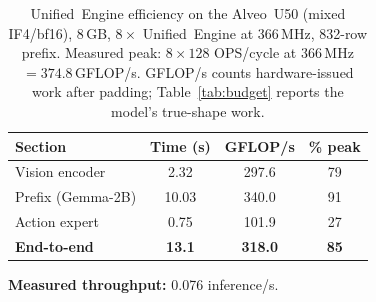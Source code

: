 \documentclass[11pt]{article}
\newcommand{\ue}{Unified~Engine}
\newcommand{\iffour}{IF4}
\newcommand{\bfteen}{bf16}
\newcommand{\alveo}{Alveo~U50}
\begin{document}
\begin{table}[H]
\centering\small
\caption{\ue{} efficiency on the \alveo{} (mixed \iffour{}/\bfteen{}),
$8$\,GB, $8\times$ \ue{} at $366$\,MHz, 832-row prefix. Measured peak:
$8\times128$ OPS/cycle at $366$\,MHz $= 374.8$\,GFLOP/s. GFLOP/s counts
hardware-issued work after padding; Table~\ref{tab:budget} reports the model's
true-shape work.}
\label{tab:timing-fpga}
\begin{tabular}{@{}lccc@{}}
\toprule
\textbf{Section} & \textbf{Time (s)} & \textbf{GFLOP/s} & \textbf{\% peak} \\
\midrule
Vision encoder          & 2.32  & 297.6 & 79 \\
Prefix (Gemma-2B)       & 10.03 & 340.0 & 91 \\
Action expert           & 0.75  & 101.9 & 27 \\
\midrule
\textbf{End-to-end}     & \textbf{13.1} & \textbf{318.0} & \textbf{85} \\
\bottomrule
\end{tabular}
\par\vspace{3pt}
\textbf{Measured throughput:} 0.076 inference/s.
\end{table}
\clearpage
\end{document}
